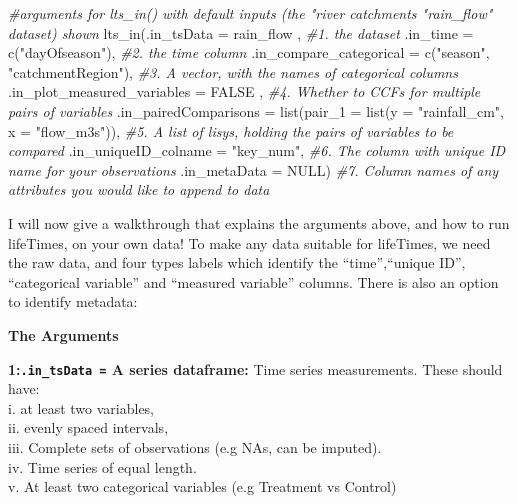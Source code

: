 \documentclass[
]{article}
\newenvironment{Shaded}{\begin{snugshade}}{\end{snugshade}}
\newcommand{\AttributeTok}[1]{\textcolor[rgb]{0.77,0.63,0.00}{#1}}
\newcommand{\CommentTok}[1]{\textcolor[rgb]{0.56,0.35,0.01}{\textit{#1}}}
\newcommand{\ConstantTok}[1]{\textcolor[rgb]{0.00,0.00,0.00}{#1}}
\newcommand{\FunctionTok}[1]{\textcolor[rgb]{0.00,0.00,0.00}{#1}}
\newcommand{\NormalTok}[1]{#1}
\newcommand{\StringTok}[1]{\textcolor[rgb]{0.31,0.60,0.02}{#1}}
\begin{document}
\begin{Shaded}
\begin{Highlighting}[]
\CommentTok{\#arguments for lts\_in() with default inputs (the "river catchments "rain\_flow" dataset) shown}
\FunctionTok{lts\_in}\NormalTok{(}\AttributeTok{.in\_tsData =}\NormalTok{ rain\_flow  , }\CommentTok{\#1. the dataset}
         \AttributeTok{.in\_time =} \FunctionTok{c}\NormalTok{(}\StringTok{"dayOfseason"}\NormalTok{), }\CommentTok{\#2. the time column}
       \AttributeTok{.in\_compare\_categorical =}  \FunctionTok{c}\NormalTok{(}\StringTok{"season"}\NormalTok{, }\StringTok{"catchmentRegion"}\NormalTok{), }\CommentTok{\#3. A vector, with the names of categorical columns}
       \AttributeTok{.in\_plot\_measured\_variables =} \ConstantTok{FALSE}\NormalTok{ , }\CommentTok{\#4. Whether to CCFs for multiple pairs of variables }
       \AttributeTok{.in\_pairedComparisons =}  \FunctionTok{list}\NormalTok{(}\AttributeTok{pair\_1 =} \FunctionTok{list}\NormalTok{(}\AttributeTok{y =} \StringTok{"rainfall\_cm"}\NormalTok{, }
        \AttributeTok{x =} \StringTok{"flow\_m3s"}\NormalTok{)), }\CommentTok{\#5. A list of lisys, holding the pairs of variables to be compared}
       \AttributeTok{.in\_uniqueID\_colname =} \StringTok{"key\_num"}\NormalTok{, }\CommentTok{\#6. The column with unique ID name for your observations}
       \AttributeTok{.in\_metaData =} \ConstantTok{NULL}\NormalTok{) }\CommentTok{\#7. Column names of any attributes you would like to append to data}
\end{Highlighting}
\end{Shaded}

I will now give a walkthrough that explains the arguments above, and how
to run lifeTimes, on your own data! To make any data suitable for
lifeTimes, we need the raw data, and four types labels which identify
the ``time'',``unique ID'', ``categorical variable'' and ``measured
variable'' columns. There is also an option to identify metadata:

\textbf{The Arguments}

\textbf{1:\texttt{.in\_tsData\ =} A series dataframe:} Time series
measurements. These should have:\\
i. at least two variables,\\
ii. evenly spaced intervals,\\
iii. Complete sets of observations (e.g NAs, can be imputed).\\
iv. Time series of equal length.\\
v. At least two categorical variables (e.g Treatment vs Control)
\end{document}
